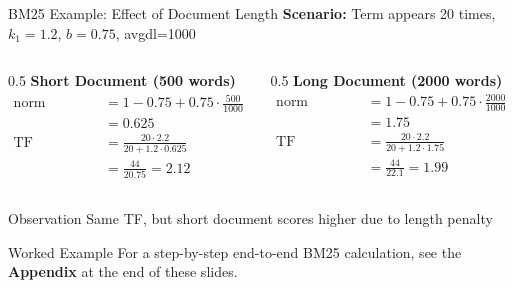 \documentclass[aspectratio=169]{beamer}
\begin{document}
\begin{frame}[shrink=15]{BM25 Example: Effect of Document Length}
\textbf{Scenario:} Term appears 20 times, $k_1=1.2$, $b=0.75$, avgdl=1000

\vspace{0.5em}

\begin{columns}
\begin{column}{0.5\textwidth}
\textbf{Short Document (500 words)}
\begin{align*}
\text{norm} &= 1 - 0.75 + 0.75 \cdot \frac{500}{1000} \\
&= 0.625 \\
\text{TF component} &= \frac{20 \cdot 2.2}{20 + 1.2 \cdot 0.625} \\
&= \frac{44}{20.75} = 2.12
\end{align*}
\end{column}

\begin{column}{0.5\textwidth}
\textbf{Long Document (2000 words)}
\begin{align*}
\text{norm} &= 1 - 0.75 + 0.75 \cdot \frac{2000}{1000} \\
&= 1.75 \\
\text{TF component} &= \frac{20 \cdot 2.2}{20 + 1.2 \cdot 1.75} \\
&= \frac{44}{22.1} = 1.99
\end{align*}
\end{column}
\end{columns}

\vspace{0.5em}

\begin{alertblock}{Observation}
Same TF, but short document scores higher due to length penalty
\end{alertblock}

\vspace{0.3em}

\begin{exampleblock}{Worked Example}
For a step-by-step end-to-end BM25 calculation, see the \textbf{Appendix} at the end of these slides.
\end{exampleblock}
\end{frame}
\end{document}
